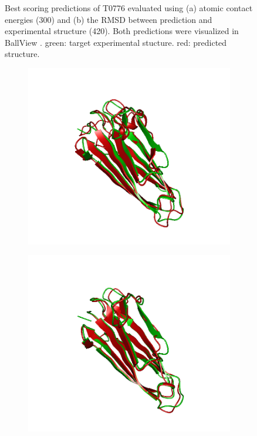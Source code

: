 \documentclass[11pt,a4paper]{article}
\renewcommand{\(}{\left (}
\renewcommand{\)}{\right )}
\begin{document}
\begin{figure}[!h]
\begin{subfigure}{.5\textwidth}
		\subcaption{}
	\end{subfigure}
	 \caption{Best scoring predictions of T0776 evaluated using (a) atomic contact energies (300) and (b) the RMSD between prediction and experimental structure (420). Both predictions were visualized in BallView \citep{ballview}. green: target experimental stucture. red: predicted structure.}
\end{figure}

\begin{figure}[!h]
	\begin{subfigure}{.5\textwidth}
		\includegraphics[width=\textwidth]{figures/T0784TS117}
		\subcaption{}
	\end{subfigure}
	\begin{subfigure}{.5\textwidth}
		\includegraphics[width=\textwidth]{figures/T0784TS156}

\end{subfigure}
\end{figure}
\end{document}
